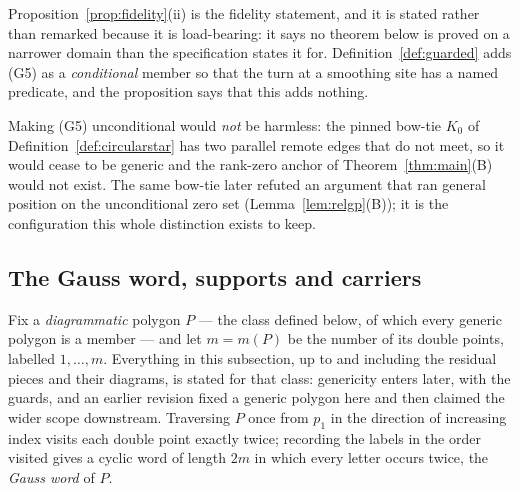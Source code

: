 \begin{remark}
\label{rem:fidelity}
Proposition~\ref{prop:fidelity}(ii) is the fidelity statement, and it is stated
rather than remarked because it is load-bearing: it says no theorem below is
proved on a narrower domain than the specification states it for.
Definition~\ref{def:guarded} adds (G5) as a \emph{conditional} member so that
the turn at a smoothing site has a named predicate, and the proposition says
that this adds nothing.

Making (G5) unconditional would \emph{not} be harmless: the pinned bow-tie $K_0$
of Definition~\ref{def:circularstar} has two parallel remote edges that do not
meet, so it would cease to be generic and the rank-zero anchor of
Theorem~\ref{thm:main}(B) would not exist. The same bow-tie later refuted an
argument that ran general position on the unconditional zero set
(Lemma~\ref{lem:relgp}(B)); it is the configuration this whole distinction exists
to keep.
\end{remark}


\subsection{The Gauss word, supports and carriers}

Fix a \emph{diagrammatic} polygon $P$ --- the class defined below, of which
every generic polygon is a member --- and let $m=m(P)$ be the number of its
double points, labelled $1,\dots,m$. Everything in this subsection, up to and
including the residual pieces and their diagrams, is stated for that class:
genericity enters later, with the guards, and an earlier revision fixed a
generic polygon here and then claimed the wider scope downstream. Traversing $P$ once from $p_1$ in the direction of
increasing index visits each double point exactly twice; recording the labels in
the order visited gives a cyclic word of length $2m$ in which every letter occurs
twice, the \emph{Gauss word} of $P$.

